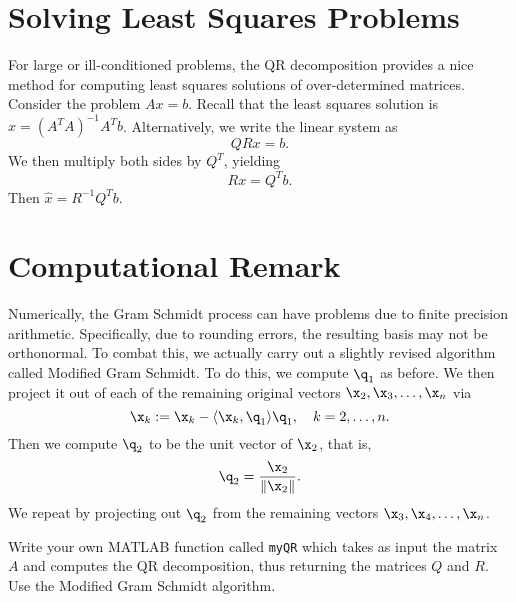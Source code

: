 \section*{Solving Least Squares Problems}

For large or ill-conditioned problems, the QR decomposition provides
a nice method for computing least squares solutions of
over-determined matrices.  Consider the problem $A x = b$.  Recall
that the least squares solution is $\widehat x = (A^T A)^{-1}A^T b$.
Alternatively, we write the linear system as
\[
Q R x = b.
\]
We then multiply both sides by $Q^T$, yielding
\[
R x = Q^T b.
\]
Then $\widehat x = R^{-1} Q^T b$.

\section*{Computational Remark}

Numerically, the Gram Schmidt process can have problems due to
finite precision arithmetic. Specifically, due to rounding errors,
the resulting basis may not be orthonormal. To combat this, we
actually carry out a slightly revised algorithm called Modified Gram
Schmidt.  To do this, we compute $\q_1$ as before.  We then project
it out of each of the remaining original vectors
$\x_2,\x_3,\ldots,\x_n$ via
\[
\x_k := \x_k - \langle \x_{k}, \q_1\rangle \q_1,\quad k=2,\ldots,n.
\]
Then we compute $\q_2$ to be the unit vector of $\x_2$, that is,
\[
\q_2 = \frac{\x_2}{\|\x_2\|}.
\]
We repeat by projecting out $\q_2$ from the remaining vectors
$\x_3,\x_4,\ldots,\x_n$.

\begin{problem}
Write your own MATLAB function called {\tt myQR} which takes as
input the matrix $A$ and computes the QR decomposition, thus
returning the matrices $Q$ and $R$.  Use the Modified Gram Schmidt
algorithm.
\end{problem}
